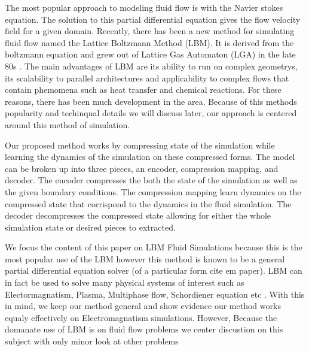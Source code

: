 \documentclass{article}
\begin{document}
The most popular approach to modeling fluid flow is with the Navier stokes equation. The solution to this partial differential equation gives the flow velocity field for a given domain. Recently, there has been a new method for simulating fluid flow named the Lattice Boltzmann Method (LBM). It is derived from the boltzmann equation and grew out of Lattice Gas Automaton (LGA) in the late 80s \cite{mcnamara1988use}. The main advantages of LBM are its ability to run on complex geometrys, its scalability to parallel architectures and applicability to complex flows that contain phemomena such as heat transfer and chemical reactions. For these reasons, there has been much development in the area. Because of this methods popularity and techinqual details we will discuss later, our approach is centered around this method of simulation.

Our proposed method works by compressing state of the simulation while learning the dynamics of the simulation on these compressed forms. The model can be broken up into three pieces, an encoder, compression mapping, and decoder. The encoder compresses the both the state of the simulation as well as the given boundary conditions. The compression mapping learn dynamics on the compressed state that corrispond to the dynamics in the fluid simulation. The decoder decompresses the compressed state allowing for either the whole simulation state or desired pieces to extracted.

We focus the content of this paper on LBM Fluid Simulations because this is the most popular use of the LBM however this method is known to be a general partial differential equation solver (of a particular form cite em paper). LBM can in fact be used to solve many physical systems of interest such as Electormagnatism, Plasma, Multiphase flow, Schordiener equation etc \cite{mendoza2010three} \cite{kim2008wavelet} \cite{zhong2006lattice} \cite{shan1993lattice}. With this in mind, we keep our method general and show evidence our method works equaly effectively on Electromagnatism simulations. However, Because the domanate use of LBM is on fluid flow problems we center discustion on this subject with only minor look at other problems
\end{document}
